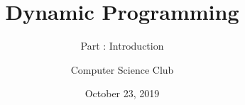 \documentclass{cspresentation}
\title{Dynamic Programming}
\subtitle{Part \rom{2}: Introduction}
\institute{Stephen Lewis Secondary School}
\author{Computer Science Club}
\date{October 23, 2019}
\begin{document}
\begin{frame}
\titlepage
\end{frame}
\end{document}
